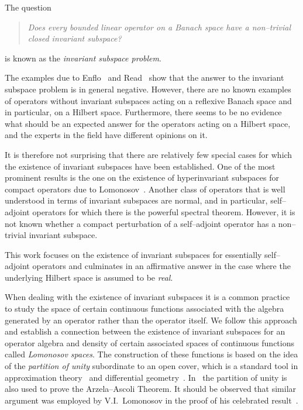 

The question
\begin{quote}
{\em Does every bounded linear operator on a Banach space have
a non--trivial closed invariant subspace? }
\end{quote}
is known as the {\em invariant subspace problem}.

\medskip

The examples due to Enflo~\cite{Enf87} and Read~\cite{Rea85}
show that the answer to the invariant subspace problem is in
general negative. However, there are no known examples of
operators without invariant subspaces acting on a reflexive
Banach space and in particular, on a Hilbert space.
Furthermore, there seems to be no evidence what should be an
expected answer for the operators acting on a Hilbert space,
and the experts in the field have different opinions on it.

It is therefore not surprising that there are relatively few
special cases for which the existence of invariant subspaces
have been established. One of the most prominent results is the
one on the existence of hyperinvariant subspaces for compact
operators due to Lomonosov~\cite{Lom73,RR73}. Another class of
operators that is well understood in terms of invariant
subspaces are normal, and in particular, self--adjoint
operators for which there is the powerful spectral theorem.
However, it is not known whether a compact perturbation of a
self--adjoint operator has a non--trivial invariant subspace.

This work focuses on the existence of invariant subspaces for
essentially self--adjoint operators and culminates in an
affirmative answer in the case where the underlying Hilbert
space is assumed to be {\em real}.

\medskip

When dealing with the existence of invariant subspaces it is a
common practice~\cite{AAB95,dB93,Lom91} to study the space of
certain continuous functions associated with the algebra
generated by an operator rather than the operator itself. We
follow this approach and establish a connection between the
existence of invariant subspaces for an operator algebra and
density of certain associated spaces of continuous functions
called {\em Lomonosov spaces}. The construction of these
functions is based on the idea of the {\em partition of unity}
subordinate to an open cover, which is a standard tool in
approximation theory~\cite{Gam90} and differential
geometry~\cite{Dev68,Spi65}. In~\cite{Dev68} the partition of
unity is also used to prove the Arzela--Ascoli Theorem. It
should be observed that similar argument was employed by
V.I.~Lomonosov in the proof of his celebrated
result~\cite{Lom73}.

